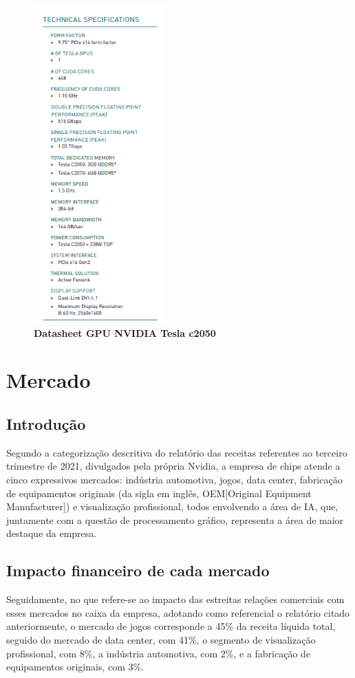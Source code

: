 \documentclass[conference]{IEEEtran}
\begin{document}
\begin{figure}[!h]
\centerline{\includegraphics[width = 2.0in]{datac2050.png}}
\caption{\textbf{Datasheet GPU NVIDIA Tesla c2050}}
\label{figAM9300}
\end{figure}

\section{Mercado}
\subsection{Introdução}
\par Segundo a categorização descritiva do relatório das receitas referentes ao terceiro trimestre de 2021, divulgados pela própria Nvidia, a empresa de chips atende a cinco expressivos mercados: indústria automotiva, jogos, data center, fabricação de equipamentos originais (da sigla em inglês, OEM[Original Equipment Manufacturer]) e visualização profissional, todos envolvendo a área de IA, que, juntamente com a questão de processamento gráfico, representa a área de maior destaque da empresa.

\subsection{Impacto financeiro de cada mercado}
\par Seguidamente, no que refere-se ao impacto das estreitas relações comerciais com esses mercados no caixa da empresa, adotando como referencial o relatório citado anteriormente, o mercado de jogos corresponde a 45\% da receita líquida total, seguido do mercado de data center, com 41\%, o segmento de visualização profissional, com 8\%, a indústria automotiva, com 2\%, e a fabricação de equipamentos originais, com 3\%.
\end{document}
